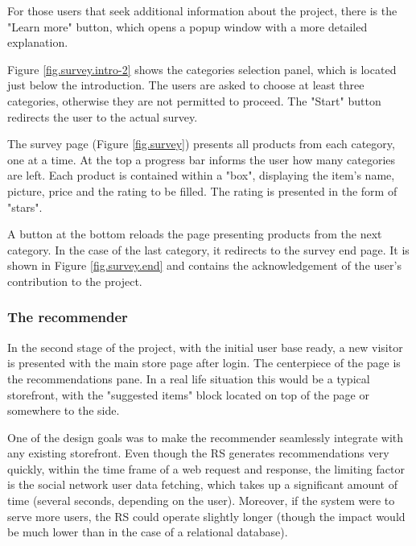 \documentclass[12pt]{report}
\begin{document}
For those users that seek additional information about the project, there is the "Learn more" button, which opens a popup window with a more detailed explanation.

Figure \ref{fig.survey.intro-2} shows the categories selection panel, which is located just below the introduction. The users are asked to choose at least three categories, otherwise they are not permitted to proceed. The "Start" button redirects the user to the actual survey.

The survey page (Figure \ref{fig.survey}) presents all products from each category, one at a time. At the top a progress bar informs the user how many categories are left. Each product is contained within a "box", displaying the item's name, picture, price and the rating to be filled. The rating is presented in the form of "stars".

A button at the bottom reloads the page presenting products from the next category. In the case of the last category, it redirects to the survey end page. It is shown in Figure \ref{fig.survey.end} and contains the acknowledgement of the user's contribution to the project.

\subsubsection{The recommender}


In the second stage of the project, with the initial user base ready, a new visitor is presented with the main store page after login. The centerpiece of the page is the recommendations pane. In a real life situation this would be a typical storefront, with the "suggested items" block located on top of the page or somewhere to the side.

One of the design goals was to make the recommender seamlessly integrate with any existing storefront. Even though the RS generates recommendations very quickly, within the time frame of a web request and response, the limiting factor is the social network user data fetching, which takes up a significant amount of time (several seconds, depending on the user). Moreover, if the system were to serve more users, the RS could operate slightly longer (though the impact would be much lower than in the case of a relational database).
\end{document}
